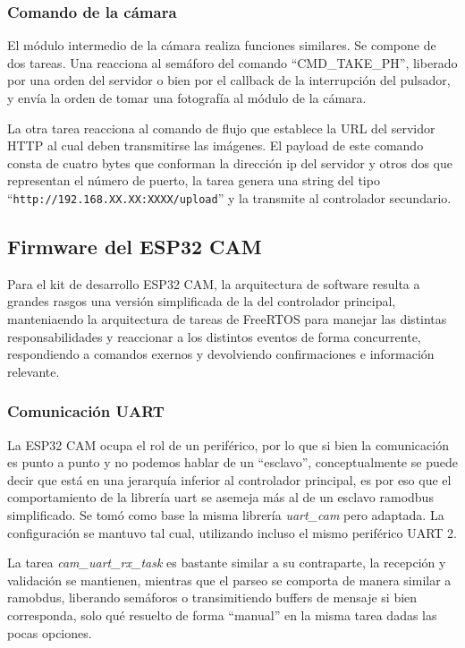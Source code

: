 \subsubsection{Comando de la cámara}
El módulo intermedio de la cámara realiza funciones similares. Se compone de dos tareas. 
Una reacciona al semáforo del comando \enquote{CMD\_TAKE\_PH}, liberado por una orden del servidor o bien por el callback de la interrupción del pulsador, y envía la orden de tomar una fotografía al módulo de la cámara.

La otra tarea reacciona al comando de flujo que establece la URL del servidor HTTP al cual deben transmitirse las imágenes. El payload de este comando consta de cuatro bytes que conforman la dirección ip del servidor y otros dos que representan el número de puerto, la tarea genera una string del tipo \enquote{\texttt{http://192.168.XX.XX:XXXX/upload}} y la transmite al controlador secundario.


\subsection{Firmware del ESP32 CAM}
Para el kit de desarrollo ESP32 CAM, la arquitectura de software resulta a grandes rasgos una versión simplificada de la del controlador principal, manteniaendo la arquitectura de tareas de FreeRTOS para manejar las distintas responsabilidades y reaccionar a los distintos eventos de forma concurrente, respondiendo a comandos exernos y devolviendo confirmaciones e información relevante.


\subsubsection{Comunicación UART}
La ESP32 CAM ocupa el rol de un periférico, por lo que si bien la comunicación es punto a punto y no podemos hablar de un \enquote{esclavo}, conceptualmente se puede decir que está en una jerarquía inferior al controlador principal, es por eso que el comportamiento de la librería uart se asemeja más al de un esclavo ramodbus simplificado. 
Se tomó como base la misma librería \textit{uart\_cam} pero adaptada. La configuración se mantuvo tal cual, utilizando incluso el mismo periférico UART 2. 

La tarea \textit{cam\_uart\_rx\_task} es bastante similar a su contraparte, la recepción y validación se mantienen, mientras que el parseo se comporta de manera similar a ramobdus, liberando semáforos o transimitiendo buffers de mensaje si bien corresponda, solo qué resuelto de forma \enquote{manual} en la misma tarea dadas las pocas opciones.


